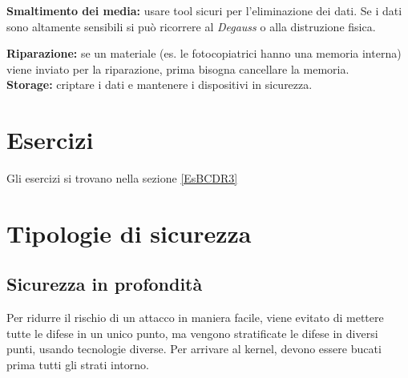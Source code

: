 \textbf{Smaltimento dei media:} usare tool sicuri per l'eliminazione dei dati. 
Se i dati sono altamente sensibili si può ricorrere al \textit{Degauss} o alla 
distruzione fisica.\\
\newline 

\textbf{Riparazione:} se un materiale (es. le fotocopiatrici hanno una memoria 
interna) viene inviato per la riparazione, prima bisogna cancellare la memoria.
\\
\newline
\textbf{Storage:} criptare i dati e mantenere i dispositivi in sicurezza.

\section{Esercizi}

Gli esercizi si trovano nella sezione \ref{EsBCDR3}

\section{Tipologie di sicurezza}

\subsection{Sicurezza in profondità}

Per ridurre il rischio di un attacco in maniera facile, viene evitato di
mettere tutte le difese in un unico punto, ma vengono stratificate le difese in
diversi punti, usando tecnologie diverse.
Per arrivare al kernel, devono essere bucati prima tutti gli strati intorno.
